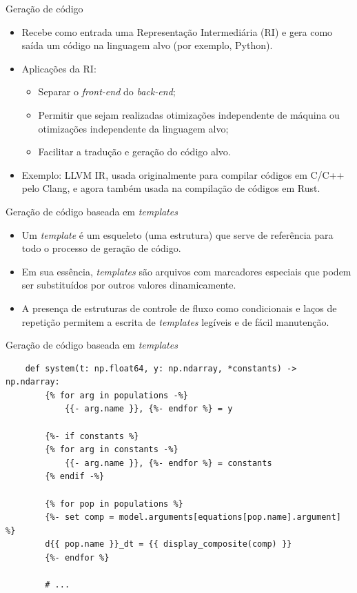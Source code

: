 \begin{frame}{Geração de código}
    \begin{itemize}
        \item Recebe como entrada uma Representação Intermediária (RI) e gera como saída um código na linguagem alvo (por exemplo, Python).
        \item Aplicações da RI: 
        \begin{itemize}
            \item Separar o \textit{front-end} do \textit{back-end};
            \item Permitir que sejam realizadas otimizações independente de máquina ou otimizações independente da linguagem alvo; 
            \item Facilitar a tradução e geração do código alvo.
        \end{itemize}
        \item Exemplo: LLVM IR, usada originalmente para compilar códigos em C/C++ pelo Clang, e agora também usada na compilação de códigos em Rust.
    \end{itemize}    
\end{frame}

\begin{frame}{Geração de código baseada em \textit{templates}}
    \begin{itemize}
        \item Um \textit{template} é um esqueleto (uma estrutura) que serve de referência para todo o processo de geração de código.
        \item Em sua essência, \textit{templates} são arquivos com marcadores especiais que podem ser substituídos por outros valores dinamicamente.
        \item A presença de estruturas de controle de fluxo como condicionais e laços de repetição permitem a escrita de \textit{templates} legíveis e de fácil manutenção.
    \end{itemize}
\end{frame}

\begin{frame}[fragile]{Geração de código baseada em \textit{templates}}
    \begin{verbatim}
    def system(t: np.float64, y: np.ndarray, *constants) -> np.ndarray:
        {% for arg in populations -%}
            {{- arg.name }}, {%- endfor %} = y

        {%- if constants %}
        {% for arg in constants -%}
            {{- arg.name }}, {%- endfor %} = constants
        {% endif -%}

        {% for pop in populations %}
        {%- set comp = model.arguments[equations[pop.name].argument] %}
        d{{ pop.name }}_dt = {{ display_composite(comp) }}
        {%- endfor %}

        # ...
    \end{verbatim}
\end{frame}

